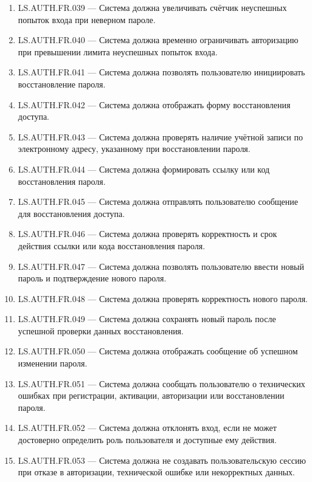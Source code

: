 \documentclass[12pt,a4paper]{article}
\begin{document}
\begin{enumerate}
		\item LS.AUTH.FR.039 --- Система должна увеличивать счётчик неуспешных попыток
		входа при неверном пароле.
		
		\item LS.AUTH.FR.040 --- Система должна временно ограничивать авторизацию при
		превышении лимита неуспешных попыток входа.
		
		\item LS.AUTH.FR.041 --- Система должна позволять пользователю инициировать
		восстановление пароля.
		
		\item LS.AUTH.FR.042 --- Система должна отображать форму восстановления
		доступа.
		
		\item LS.AUTH.FR.043 --- Система должна проверять наличие учётной записи по
		электронному адресу, указанному при восстановлении пароля.
		
		\item LS.AUTH.FR.044 --- Система должна формировать ссылку или код
		восстановления пароля.
		
		\item LS.AUTH.FR.045 --- Система должна отправлять пользователю сообщение для
		восстановления доступа.
		
		\item LS.AUTH.FR.046 --- Система должна проверять корректность и срок действия
		ссылки или кода восстановления пароля.
		
		\item LS.AUTH.FR.047 --- Система должна позволять пользователю ввести новый
		пароль и подтверждение нового пароля.
		
		\item LS.AUTH.FR.048 --- Система должна проверять корректность нового пароля.
		
		\item LS.AUTH.FR.049 --- Система должна сохранять новый пароль после успешной
		проверки данных восстановления.
		
		\item LS.AUTH.FR.050 --- Система должна отображать сообщение об успешном
		изменении пароля.
		
		\item LS.AUTH.FR.051 --- Система должна сообщать пользователю о технических
		ошибках при регистрации, активации, авторизации или восстановлении пароля.
		
		\item LS.AUTH.FR.052 --- Система должна отклонять вход, если не может
		достоверно определить роль пользователя и доступные ему действия.
		
		\item LS.AUTH.FR.053 --- Система должна не создавать пользовательскую сессию
		при отказе в авторизации, технической ошибке или некорректных данных.
	\end{enumerate}
	
\end{document}

